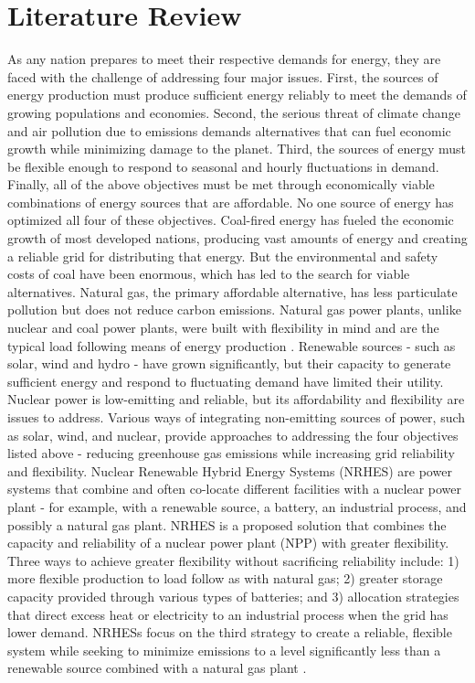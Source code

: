 \documentclass[12pt]{UIdahoMastersThesis}
\begin{document}
\clearpage
\chapter{Literature Review}
\label{Introduction to Nuclear Renewable Hybrid Energy Systems}

As any nation prepares to meet their respective demands for energy, they are faced with the challenge of addressing four major issues. First, the sources of energy production must produce sufficient energy reliably to meet the demands of growing populations and economies. Second, the serious threat of climate change and air pollution due to emissions demands alternatives that can fuel economic growth while minimizing damage to the planet. Third, the sources of energy must be flexible enough to respond to seasonal and hourly fluctuations in demand. Finally, all of the above objectives must be met through economically viable combinations of energy sources that are affordable.
No one source of energy has optimized all four of these objectives. Coal-fired energy has fueled the economic growth of most developed nations, producing vast amounts of energy and creating a reliable grid for distributing that energy. But the environmental and safety costs of coal have been enormous, which has led to the search for viable alternatives. Natural gas, the primary affordable alternative, has less particulate pollution but does not reduce carbon emissions. Natural gas power plants, unlike nuclear and coal power plants, were built with flexibility in mind and are the typical load following means of energy production \cite{MITEnergyInitiative2011}. Renewable sources - such as solar, wind and hydro - have grown significantly, but their capacity to generate sufficient energy and respond to fluctuating demand have limited their utility. Nuclear power is low-emitting and reliable, but its affordability and flexibility are issues to address.
Various ways of integrating non-emitting sources of power, such as solar, wind, and nuclear, provide approaches to addressing the four objectives listed above - reducing greenhouse gas emissions while increasing grid reliability and flexibility. Nuclear Renewable Hybrid Energy Systems (NRHES) are power systems that combine and often co-locate different facilities with a nuclear power plant - for example, with a renewable source, a battery, an industrial process, and possibly a natural gas plant.  NRHES is a proposed solution that combines the capacity and reliability of a nuclear power plant (NPP) with greater flexibility.  Three ways to achieve greater flexibility without sacrificing reliability include: 1) more flexible production to load follow as with natural gas; 2) greater storage capacity provided through various types of batteries; and 3)  allocation strategies that direct excess heat or electricity to an industrial process when the grid has lower demand. NRHESs focus on the third strategy to create a reliable, flexible system while seeking to minimize emissions to a level significantly less than a renewable source combined with a natural gas plant \cite{Baker2016}.
\end{document}
